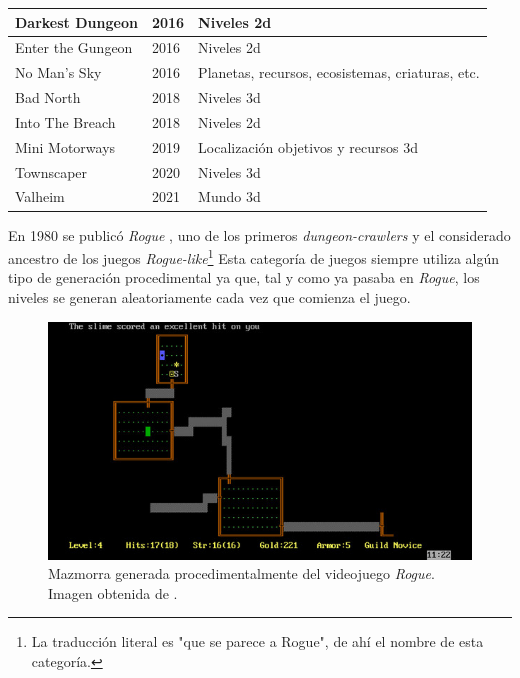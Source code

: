 \begin{table}[H]
\begin{tabular}{|l|l|l|}
    Darkest Dungeon & 2016 & Niveles \acrshort{2d} \\ \hline
    Enter the Gungeon & 2016 & Niveles \acrshort{2d} \\ \hline
    No Man's Sky & 2016 & Planetas, recursos, ecosistemas, criaturas, etc.  \\ \hline
    Bad North & 2018 & Niveles \acrshort{3d}  \\ \hline
    Into The Breach & 2018 & Niveles \acrshort{2d}\\ \hline
    Mini Motorways & 2019 & Localización objetivos y recursos \acrshort{3d} \\ \hline
    Townscaper & 2020 & Niveles \acrshort{3d} \\ \hline
    Valheim & 2021 & Mundo \acrshort{3d} \\ \hline
    \end{tabular}
\end{table}

\newpage

En 1980 se publicó \textit{Rogue} \cite{wichman1997}, uno de los primeros \textit{dungeon-crawlers} y el considerado ancestro de los juegos \textit{Rogue-like}\footnote{La traducción literal es "que se parece a Rogue", de ahí el nombre de esta categoría.} Esta categoría de juegos siempre utiliza algún tipo de generación procedimental ya que, tal y como ya pasaba en \textit{Rogue}, los niveles se generan aleatoriamente cada vez que comienza el juego.\\

\begin{figure}[H]
    \begin{center}
        \includegraphics[scale=0.37]{img/rogue.jpg}
        \caption{Mazmorra generada procedimentalmente del videojuego \textit{Rogue}. Imagen obtenida de \cite{epyx}.}
    \end{center}
\end{figure}

